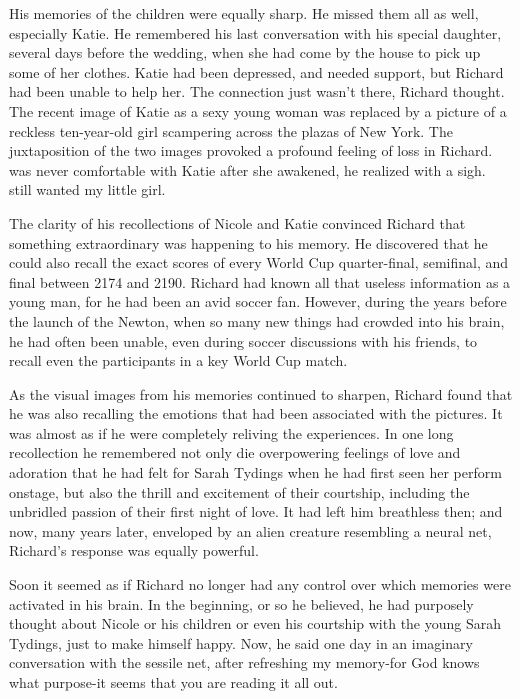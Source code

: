 \documentclass[]{article}
\begin{document}
{{His memories of the children were equally sharp.  He missed them all as well, especially Katie.  He remembered his last conversation with his special daughter, several days before the wedding, when she had come by the house to pick up some of her clothes.  Katie had been depressed, and needed support, but Richard had been unable to help her.  The connection just wasn’t there, Richard thought.  The recent image of Katie as a sexy young woman was replaced by a picture of a reckless ten-year-old girl scampering across the plazas of New York.  The juxtaposition of the two images provoked a profound feeling of loss in Richard.  was never comfortable with Katie after she awakened, he realized with a sigh.  still wanted my little girl.

The clarity of his recollections of Nicole and Katie convinced Richard that something extraordinary was happening to his memory.  He discovered that he could also recall the exact scores of every World Cup quarter-final, semifinal, and final between 2174 and 2190.  Richard had known all that useless information as a young man, for he had been an avid soccer fan.  However, during the years before the launch of the Newton, when so many new things had crowded into his brain, he had often been unable, even during soccer discussions with his friends, to recall even the participants in a key World Cup match.

As the visual images from his memories continued to sharpen, Richard found that he was also recalling the emotions that had been associated with the pictures.  It was almost as if he were completely reliving the experiences.  In one long recollection he remembered not only die overpowering feelings of love and adoration that he had felt for Sarah Tydings when he had first seen her perform onstage, but also the thrill and excitement of their courtship, including the unbridled passion of their first night of love.  It had left him breathless then; and now, many years later, enveloped by an alien creature resembling a neural net, Richard’s response was equally powerful.

Soon it seemed as if Richard no longer had any control over which memories were activated in his brain.  In the beginning, or so he believed, he had purposely thought about Nicole or his children or even his courtship with the young Sarah Tydings, just to make himself happy.  Now, he said one day in an imaginary conversation with the sessile net, after refreshing my memory-for God knows what purpose-it seems that you are reading it all out.

}}
\end{document}

